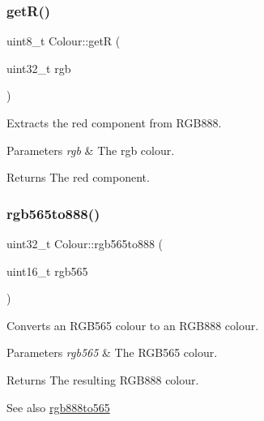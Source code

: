 \subsubsection{\texorpdfstring{get\+R()}{getR()}}
{\footnotesize\ttfamily uint8\+\_\+t Colour\+::getR (\begin{DoxyParamCaption}\item[{uint32\+\_\+t}]{rgb }\end{DoxyParamCaption})}



Extracts the red component from R\+G\+B888. 


\begin{DoxyParams}{Parameters}
{\em rgb} & The rgb colour. \\
\hline
\end{DoxyParams}
\begin{DoxyReturn}{Returns}
The red component. 
\end{DoxyReturn}
\mbox{\label{namespaceColour_aa7b3de65f5d56d88b13863de9aa5641a}} 
\subsubsection{\texorpdfstring{rgb565to888()}{rgb565to888()}}
{\footnotesize\ttfamily uint32\+\_\+t Colour\+::rgb565to888 (\begin{DoxyParamCaption}\item[{uint16\+\_\+t}]{rgb565 }\end{DoxyParamCaption})}



Converts an R\+G\+B565 colour to an R\+G\+B888 colour. 


\begin{DoxyParams}{Parameters}
{\em rgb565} & The R\+G\+B565 colour. \\
\hline
\end{DoxyParams}
\begin{DoxyReturn}{Returns}
The resulting R\+G\+B888 colour. 
\end{DoxyReturn}
\begin{DoxySeeAlso}{See also}
\mbox{\hyperlink{namespaceColour_a5311fafb2011e62db5d600badee72ee9}{rgb888to565}} 
\end{DoxySeeAlso}
\mbox{\label{namespaceColour_a5311fafb2011e62db5d600badee72ee9}} 
